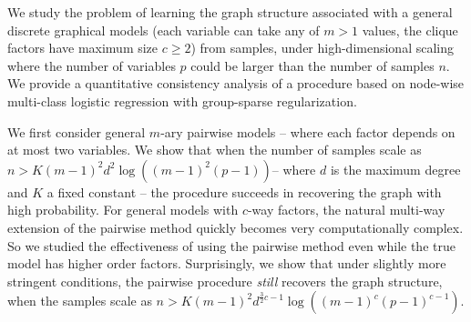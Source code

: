 We study the problem of learning the graph structure associated with a general discrete graphical models (each variable can take any of $m > 1$ values, the clique factors have maximum size $c \ge 2$) from samples, under high-dimensional scaling where the number of variables $p$ could be larger than the number of samples $n$. We provide a quantitative consistency analysis of a procedure based on node-wise multi-class logistic regression with group-sparse regularization.

We first consider general $m$-ary pairwise models -- where each factor depends on at most two variables. We show that when the number of samples scale as \small$n > K(m-1)^2 d^2 \log ( (m-1)^2(p-1))$\normalsize -- where $d$ is the maximum degree and $K$ a fixed constant -- the procedure succeeds in recovering the graph with high probability. For general models with $c$-way factors, the natural multi-way extension of the pairwise method quickly becomes very computationally complex. So we studied the effectiveness of using the pairwise method even while the true model has higher order factors. Surprisingly, we show that under slightly more stringent conditions, the pairwise procedure {\em still} recovers the graph structure,  when the samples scale as \small$n > K (m-1)^2 d^{\frac{3}{2}c - 1} \log ( (m-1)^c (p-1)^{c-1} )$\normalsize. 
